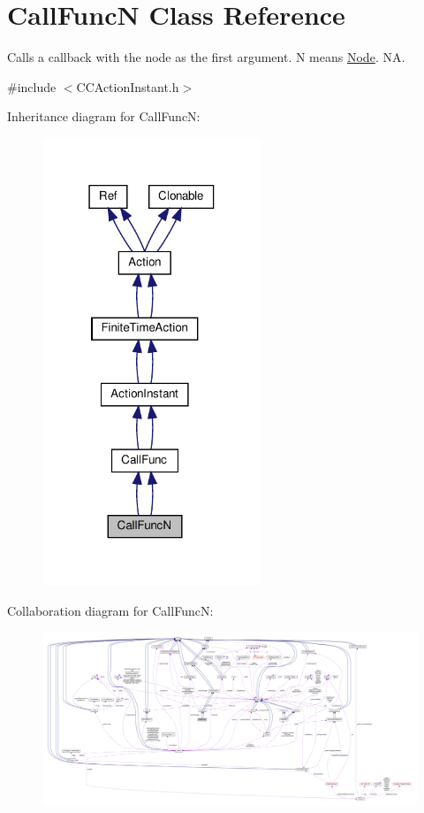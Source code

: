 \hypertarget{classCallFuncN}{}\section{Call\+FuncN Class Reference}
\label{classCallFuncN}


Calls a \textquotesingle{}callback\textquotesingle{} with the node as the first argument. N means \hyperlink{classNode}{Node}.  NA.  




{\ttfamily \#include $<$C\+C\+Action\+Instant.\+h$>$}



Inheritance diagram for Call\+FuncN\+:
\nopagebreak
\begin{figure}[H]
\begin{center}
\leavevmode
\includegraphics[width=186pt]{classCallFuncN__inherit__graph}
\end{center}
\end{figure}


Collaboration diagram for Call\+FuncN\+:
\nopagebreak
\begin{figure}[H]
\begin{center}
\leavevmode
\includegraphics[width=350pt]{classCallFuncN__coll__graph}
\end{center}
\end{figure}
